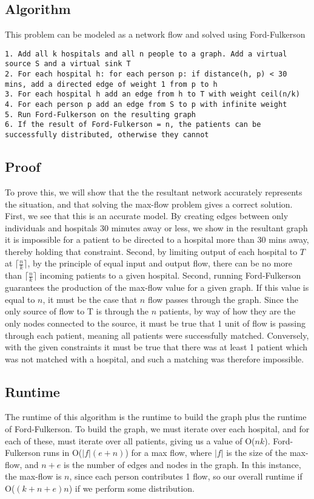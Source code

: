 \documentclass[titlepage]{article}
\begin{document}
\subsection{Algorithm}
This problem can be modeled as a network flow and solved using Ford-Fulkerson
\begin{lstlisting}
1. Add all k hospitals and all n people to a graph. Add a virtual source S and a virtual sink T
2. For each hospital h: for each person p: if distance(h, p) < 30 mins, add a directed edge of weight 1 from p to h
3. For each hospital h add an edge from h to T with weight ceil(n/k)
4. For each person p add an edge from S to p with infinite weight
5. Run Ford-Fulkerson on the resulting graph
6. If the result of Ford-Fulkerson = n, the patients can be successfully distributed, otherwise they cannot
\end{lstlisting}
\subsection{Proof}
To prove this, we will show that the the resultant network accurately represents the situation, and that solving the max-flow problem gives
a correct solution. First, we see that this is an accurate model. By creating edges between only individuals and hospitals 30 minutes away or
less, we show in the resultant graph it is impossible for a patient to be directed to a hospital more than 30 mins away, thereby holding that
constraint. Second, by limiting output of each hospital to $T$ at $\lceil\frac{n}{k}\rceil$, by the principle of equal input and output flow,
there can be no more than $\lceil\frac{n}{k}\rceil$ incoming patients to a given hospital. Second, running Ford-Fulkerson guarantees the
production of the max-flow value for a given graph. If this value is equal to $n$, it must be the case that $n$ flow passes through the graph.
Since the only source of flow to T is through the $n$ patients, by way of how they are the only nodes connected to the source, it must be
true that 1 unit of flow is passing through each patient, meaning all patients were successfully matched. Conversely, with the given constraints
it must be true that there was at least 1 patient which was not matched with a hospital, and such a matching was therefore impossible.
\subsection{Runtime}
The runtime of this algorithm is the runtime to build the graph plus the runtime of Ford-Fulkerson. To build the graph, we must iterate over
each hospital, and for each of these, must iterate over all patients, giving us a value of O($nk$). Ford-Fulkerson runs in O($|f|(e+n)$) for a
max flow, where $|f|$ is the size of the max-flow, and $n+e$ is the number of edges and nodes in the graph. In this instance, the max-flow is
$n$, since each person contributes 1 flow, so our overall runtime if O($(k+n+e)n$) if we perform some distribution.
\end{document}
